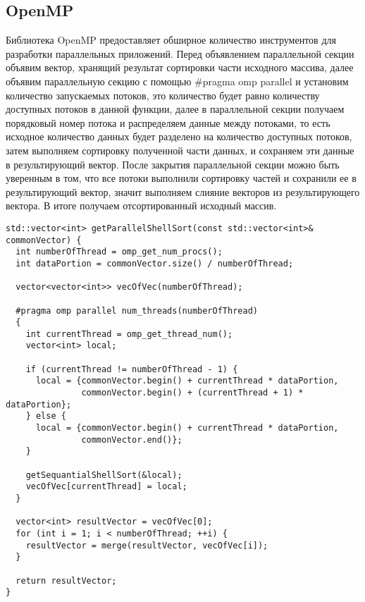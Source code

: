\documentclass{report}
\begin{document}
\subsection*{OpenMP}
\par Библиотека OpenMP предоставляет обширное количество инструментов для разработки параллельных приложений. Перед объявлением параллельной секции объявим вектор, хранящий результат сортировки части исходного массива, далее объявим параллельную секцию с помощью #pragma omp parallel и установим количество запускаемых потоков, это количество будет равно количеству доступных потоков в данной функции, далее в параллельной секции получаем порядковый номер потока и распределяем данные между потоками, то есть исходное количество данных будет разделено на количество доступных потоков, затем выполняем сортировку полученной части данных, и сохраняем эти данные в результирующий вектор. После закрытия параллельной секции можно быть уверенным в том, что все потоки выполнили сортировку частей и сохранили ее в результирующий вектор, значит выполняем слияние векторов из результирующего вектора. В итоге получаем отсортированный исходный массив.

\begin{lstlisting}
std::vector<int> getParallelShellSort(const std::vector<int>& commonVector) {
  int numberOfThread = omp_get_num_procs();
  int dataPortion = commonVector.size() / numberOfThread;

  vector<vector<int>> vecOfVec(numberOfThread);

  #pragma omp parallel num_threads(numberOfThread)
  {
    int currentThread = omp_get_thread_num();
    vector<int> local;

    if (currentThread != numberOfThread - 1) {
      local = {commonVector.begin() + currentThread * dataPortion,
               commonVector.begin() + (currentThread + 1) * dataPortion};
    } else {
      local = {commonVector.begin() + currentThread * dataPortion,
               commonVector.end()};
    }

    getSequantialShellSort(&local);
    vecOfVec[currentThread] = local;
  }

  vector<int> resultVector = vecOfVec[0];
  for (int i = 1; i < numberOfThread; ++i) {
    resultVector = merge(resultVector, vecOfVec[i]);
  }

  return resultVector;
}
\end{lstlisting}

\newpage
\end{document}
